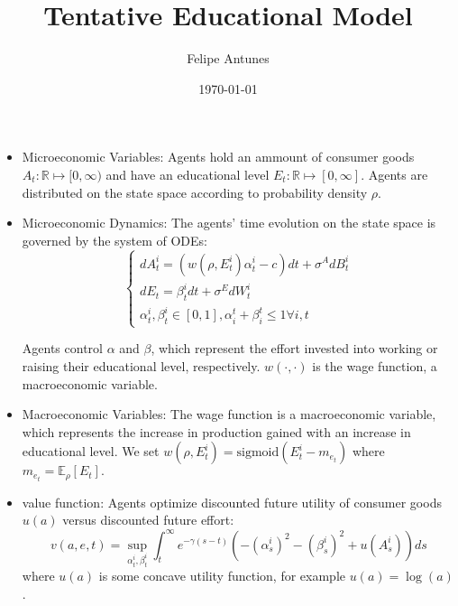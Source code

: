 \documentclass{article}
\title{Tentative Educational Model}
\author{Felipe Antunes}
\date{\today}
\begin{document}
\maketitle

\begin{itemize}
    \item Microeconomic Variables: Agents hold an ammount of consumer goods
     $A_t:\mathbb{R} \mapsto [0,\infty)$ 
     and have an educational level 
     $E_t: \mathbb{R} \mapsto [0,\infty]$. 
    Agents are distributed on the state space according to probability density
     $\rho$.
    \item Microeconomic Dynamics: The agents' time evolution on the state space 
    is governed by the system of ODEs:
    \begin{equation}
        \begin{cases}
            d A_t^i = \left( w(\rho, E^i_t)\alpha_t^i - c  \right)dt + \sigma^{A} dB^i_t\\
            d E_t = \beta^i_t dt + \sigma^{E} d W_t^i \\
            \alpha^i_t, \beta^i_t \in [0,1], \alpha_i^t + \beta_i^t \leq 1 \forall i, t
        \end{cases}
    \end{equation}

    Agents control $\alpha$ and $\beta$, which represent the effort invested 
    into working or raising their educational level, respectively. 
    $w(\cdot, \cdot)$ is the wage function,
    a macroeconomic variable.

    \item Macroeconomic Variables: The wage function is a macroeconomic variable, 
    which represents the increase in production gained with an increase in 
    educational level.
    We set 
    $w(\rho, E^i_t) = \text{sigmoid}(E^i_t - m_{e_t})$ 
    where
    $m_{e_t} = \mathbb{E}_\rho [E_t].$
    \item value function: Agents optimize discounted future utility
     of consumer goods $u(a)$ versus discounted future effort:
    \begin{equation}
        v(a,e,t) = \sup_{\alpha^i_t, \beta^i_t} \int_t^\infty e^{- \gamma (s - t)} \left( - (\alpha_s^i)^2 - (\beta_s^i)^2 + u(A_s^i) \right) ds
    \end{equation}
    where $u(a)$ is some concave utility function, for example $u(a) = \log(a)$.


\end{itemize}
\end{document}
